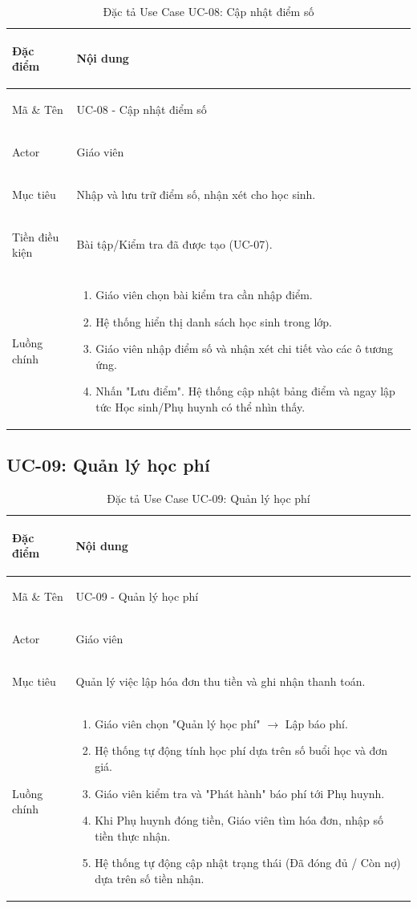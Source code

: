 \begin{table}[htbp]
\centering
\small
\caption{Đặc tả Use Case UC-08: Cập nhật điểm số}
\label{tab:uc08-cap-nhat-diem-so}
\begin{tabularx}{\textwidth}{|>{\bfseries\raggedright\arraybackslash}p{2.5cm}|X|}
\hline
Đặc điểm & Nội dung \\ \hline
Mã \& Tên & UC-08 - Cập nhật điểm số \\ \hline
Actor & Giáo viên \\ \hline
Mục tiêu & Nhập và lưu trữ điểm số, nhận xét cho học sinh. \\ \hline
Tiền điều kiện & Bài tập/Kiểm tra đã được tạo (UC-07). \\ \hline
Luồng chính & 
\begin{enumerate}
    \item Giáo viên chọn bài kiểm tra cần nhập điểm.
    \item Hệ thống hiển thị danh sách học sinh trong lớp.
    \item Giáo viên nhập điểm số và nhận xét chi tiết vào các ô tương ứng.
    \item Nhấn "Lưu điểm". Hệ thống cập nhật bảng điểm và ngay lập tức Học sinh/Phụ huynh có thể nhìn thấy.
\end{enumerate} \\ \hline
\end{tabularx}
\end{table}

\subsection{UC-09: Quản lý học phí}

\begin{table}[htbp]
\centering
\small
\caption{Đặc tả Use Case UC-09: Quản lý học phí}
\label{tab:uc09-quan-ly-hoc-phi}
\begin{tabularx}{\textwidth}{|>{\bfseries\raggedright\arraybackslash}p{2.5cm}|X|}
\hline
Đặc điểm & Nội dung \\ \hline
Mã \& Tên & UC-09 - Quản lý học phí \\ \hline
Actor & Giáo viên \\ \hline
Mục tiêu & Quản lý việc lập hóa đơn thu tiền và ghi nhận thanh toán. \\ \hline
Luồng chính & 
\begin{enumerate}
    \item Giáo viên chọn "Quản lý học phí" $\rightarrow$ Lập báo phí.
    \item Hệ thống tự động tính học phí dựa trên số buổi học và đơn giá.
    \item Giáo viên kiểm tra và "Phát hành" báo phí tới Phụ huynh.
    \item Khi Phụ huynh đóng tiền, Giáo viên tìm hóa đơn, nhập số tiền thực nhận.
    \item Hệ thống tự động cập nhật trạng thái (Đã đóng đủ / Còn nợ) dựa trên số tiền nhận.
\end{enumerate} \\ \hline
\end{tabularx}
\end{table}

